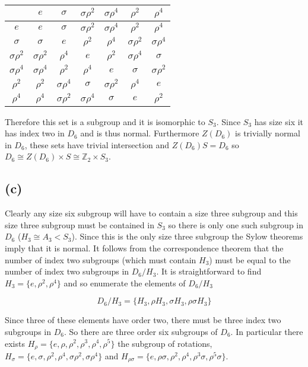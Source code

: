 \documentclass{article}
\begin{document}
\begin{center}
    \begin{tabular}{ c | c c c c c c } 
    & $e$ & $\sigma$ & $\sigma\rho^2$ & $\sigma\rho^4$ & $\rho^2$ & $\rho^4$ \\
    \hline
    $e$ & $e$ & $\sigma$ & $\sigma\rho^2$ & $\sigma\rho^4$ & $\rho^2$ & $\rho^4$ \\
    $\sigma$ & $\sigma$ & $e$ & $\rho^2$ & $\rho^4$ & $\sigma\rho^2$ & $\sigma\rho^4$ \\
    $\sigma\rho^2$ & $\sigma\rho^2$ & $\rho^4$ & $e$ & $\rho^2$ & $\sigma\rho^4$ & $\sigma$ \\
    $\sigma\rho^4$ & $\sigma\rho^4$ & $\rho^2$ & $\rho^4$ & $e$ & $\sigma$ & $\sigma\rho^2$ \\
    $\rho^2$ & $\rho^2$ & $\sigma\rho^4$ & $\sigma$ & $\sigma\rho^2$ & $\rho^4$ & $e$ \\
    $\rho^4$ & $\rho^4$ & $\sigma\rho^2$ & $\sigma\rho^4$ & $\sigma$ & $e$ & $\rho^2$ 
    \end{tabular}
\end{center}

Therefore this set is a subgroup and it is isomorphic to $S_3$. Since $S_3$ has size six it has index 
two in $D_6$ and is thus normal. Furthermore $Z(D_6)$ is trivially normal in $D_6$, these sets 
have trivial intersection and $Z(D_6)S = D_6$ so $D_6 \cong Z(D_6) \times S \cong \mathbb{Z}_2 \times S_3$.

\subsection*{(c)}
Clearly any size six subgroup will have to contain a size three subgroup and this size three subgroup must 
be contained in $S_3$ so there is only one such subgroup in $D_6$ ($H_3 \cong A_3 < S_3$). Since this 
is the only size three subgroup the Sylow theorems imply that it is normal. It follows from the correspondence 
theorem that the number of index two subgroups (which must contain $H_3$) must be equal to the 
number of index two subgroups in $D_6/H_3$. It is straightforward to find $H_3 = \{e,\rho^2,\rho^4\}$ 
and so enumerate the elements of $D_6/H_3$

\begin{equation*}
    D_6/H_3 = \{H_3,\rho H_3,\sigma H_3, \rho \sigma H_3\}
\end{equation*}

Since three of these elements have order two, there must be three index two subgroups in $D_6$. So there 
are three order six subgroups of $D_6$. In particular there exists $H_{\rho} = \{e,\rho,\rho^2,\rho^3,\rho^4,\rho^5\}$ 
the subgroup of rotations, $H_{\sigma} =  \{e,\sigma,\rho^2,\rho^4,\sigma\rho^2,\sigma\rho^4\}$ 
and $H_{\rho\sigma} = \{e,\rho\sigma,\rho^2,\rho^4,\rho^3\sigma,\rho^5\sigma\}$.
\end{document}
